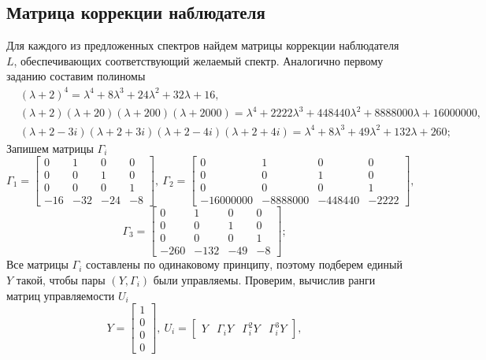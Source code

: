 \documentclass[a4paper, 12pt]{article}
\begin{document}
    \subsection{Матрица коррекции наблюдателя}
    Для каждого из предложенных спектров найдем матрицы коррекции наблюдателя $L$, обеспечивающих
    соответствующий желаемый спектр. Аналогично первому заданию составим полиномы
    \begin{align*}
    &\left(\lambda+2\right)^4=\lambda^4+8\lambda^3+24\lambda^2+32\lambda+16,\\
    &\left(\lambda+2\right)\left(\lambda+20\right)\left(\lambda+200\right)\left(\lambda+2000\right)=
    \lambda^4+2222\lambda^3+448440\lambda^2+8888000\lambda+16000000,\\
    &\left(\lambda+2-3i\right)\left(\lambda+2+3i\right)\left(\lambda+2-4i\right)\left(\lambda+2+4i\right)=
    \lambda^4+8\lambda^3+49\lambda^2+132\lambda+260;
    \end{align*}
    Запишем матрицы $\Gamma_i$
    $$
    \Gamma_1=\begin{bmatrix}
        0 &1 &0 &0\\
        0 &0 &1 &0\\
        0 &0 &0 &1\\
        -16 &-32 &-24 &-8
    \end{bmatrix},\ \Gamma_2=\begin{bmatrix}
        0 &1 &0 &0\\
        0 &0 &1 &0\\
        0 &0 &0 &1\\
        -16000000 &-8888000 &-448440 &-2222
    \end{bmatrix},
    $$
    $$
    \Gamma_3=\begin{bmatrix}
        0 &1 &0 &0\\
        0 &0 &1 &0\\
        0 &0 &0 &1\\
        -260 &-132 &-49 &-8
    \end{bmatrix};
    $$
    Все матрицы $\Gamma_i$ составлены по одинаковому принципу, поэтому подберем единый $Y$ такой, чтобы
    пары $\left(Y,\Gamma_i\right)$ были управляемы. Проверим, вычислив ранги матриц управляемости $U_i$
    $$
    Y=\begin{bmatrix}
        1\\
        0\\
        0\\
        0
    \end{bmatrix},\ U_i=\begin{bmatrix}
        Y &\Gamma_iY &\Gamma_i^2Y &\Gamma_i^3Y
    \end{bmatrix},
    $$
\end{document}
